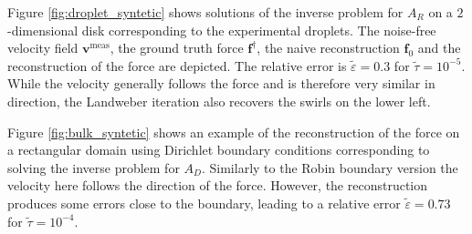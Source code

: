 \documentclass[final,leqno]{scrarticle}
\begin{document}
Figure \ref{fig:droplet_syntetic} shows solutions of the inverse problem for $A_R$ on a $2$-dimensional disk corresponding to the experimental droplets. The noise-free velocity field $\mathbf{v}^{\operatorname{meas}}$, the ground truth force $\mathbf{f}^{\dagger}$, the naive reconstruction $\mathbf{f}_0$ and the reconstruction of the force are depicted. The relative error is $\tilde{\varepsilon}=0.3$ for $\tilde{\tau}=10^{-5}$.
While the velocity generally follows the force and is therefore very similar in direction, the Landweber iteration also recovers the swirls on the lower left. 

Figure \ref{fig:bulk_syntetic} shows an example of the reconstruction of the force on a rectangular domain using Dirichlet boundary conditions corresponding to solving the inverse problem for $A_D$. Similarly to the Robin boundary version the velocity here follows the direction of the force. However, the reconstruction produces some errors close to the boundary, leading to a relative error $\tilde{\varepsilon} = 0.73$ for $\tilde{\tau}=10^{-4}$.
\end{document}
